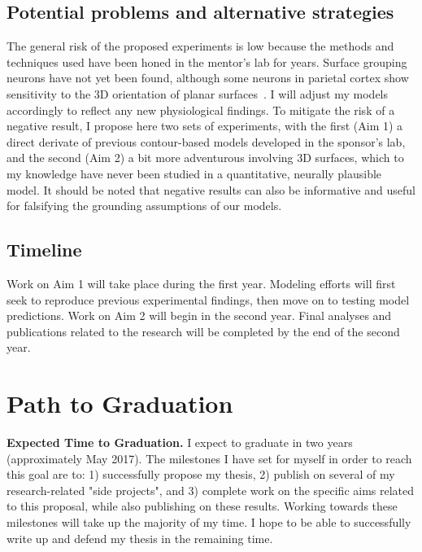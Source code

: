 \documentclass[11pt]{article}
\begin{document}
\subsection{Potential problems and alternative strategies}
The general risk of the proposed experiments is low because the
methods and techniques used have been honed in the mentor's lab for
years. Surface grouping neurons have not yet been found, although some
neurons in parietal cortex show sensitivity to the 3D orientation of
planar surfaces~\citep{Rosenberg_etal13}. I will adjust my models
accordingly to reflect any new physiological findings. To mitigate the
risk of a negative result,
 I propose here two sets of experiments,
with the first (Aim 1) a direct derivate of previous contour-based
models developed in the sponsor's lab, and the second (Aim 2) a bit
more adventurous involving 3D surfaces, which to my knowledge have
never been studied in a quantitative, neurally plausible model. It should be noted that negative results can also be informative and useful for falsifying the grounding assumptions of our models.
 
\subsection{Timeline} Work on Aim 1 will take place during the first year. Modeling efforts will first seek to reproduce previous experimental findings, then move on to testing model predictions. Work on Aim 2 will begin in the second year.
Final analyses and publications related to the research will be completed by the end of the second year.

\clearpage

\section*{Path to Graduation}

\textbf{Expected Time to Graduation.} I expect to graduate in two years (approximately May 2017). The milestones I have set for myself in order to reach this goal are to: 1) successfully propose my thesis, 2) publish on several of my research-related "side projects", and 3) complete work on the specific aims related to this proposal, while also publishing on these results. Working towards these milestones will take up the majority of my time. I hope to be able to successfully write up and defend my thesis in the remaining time.
\end{document}
